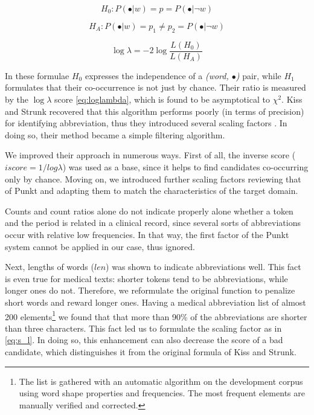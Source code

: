 \begin{equation} \label{eq:h0}
H_0: P(\bullet|w) = p = P(\bullet|\neg w)
\end{equation}

\begin{equation} \label{eq:ha}
H_A: P(\bullet|w) = p_1 \neq p_2 = P(\bullet|\neg w) 
\end{equation}

\begin{equation} \label{eq:loglambda}
\log \lambda = -2 \log \frac{L(H_0)}{L(H_A)}
\end{equation}


In these formulae $H_0$ expresses the independence of a \emph{(word, $\bullet$)} pair, while $H_1$ formulates that their co-occurrence is not just by chance. 
Their ratio is measured by the $\log \lambda$ score \eqref{eq:loglambda}, which is found to be asymptotical to $\chi^2$. %
Kiss and Strunk recovered that this algorithm performs poorly (in terms of precision) for identifying abbreviation, thus they introduced several scaling factors \cite{kiss2006unsupervised}. 
In doing so, their method %
became a simple filtering algorithm.

We improved their approach in numerous ways. 
First of all, the inverse score ($iscore=1/log\lambda$) was used as a base, since it helps to find candidates co-occurring only by chance. 
Moving on, we introduced further scaling factors reviewing that of Punkt and adapting them to match the characteristics of the target domain.

Counts and count ratios alone do not indicate properly alone whether a token and the period is related in a clinical record, since several sorts of abbreviations occur with relative low frequencies. 
In that way, the first factor of the Punkt system cannot be applied in our case, thus ignored. 

Next, lengths of words ($len$) was shown to indicate abbreviations well. 
This fact is even true for medical texts: shorter tokens tend to be abbreviations, while longer ones do not. 
Therefore, we reformulate the original function to penalize short words and reward longer ones. 
Having a medical abbreviation list of almost 200 \label{sec:abbrev} elements\footnote{The list is gathered with an automatic algorithm on the development corpus using word shape properties and frequencies. The most frequent elements are manually verified and corrected.} 
we found that that more than 90\% of the abbreviations are shorter than three characters. 
This fact led us to formulate the scaling factor as in \eqref{eq:s_l}. 
In doing so, this enhancement can also decrease the score of a bad candidate, which distinguishes it from the original formula of Kiss and Strunk.

